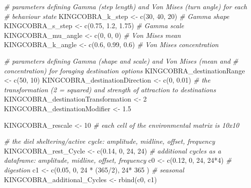 \documentclass[10pt,a4paper]{article}
\newenvironment{Shaded}{}{}
\newcommand{\CommentTok}[1]{\textit{#1}}
\newcommand{\DecValTok}[1]{#1}
\newcommand{\FloatTok}[1]{#1}
\newcommand{\FunctionTok}[1]{#1}
\newcommand{\NormalTok}[1]{#1}
\newcommand{\OtherTok}[1]{#1}
\newcommand{\SpecialCharTok}[1]{#1}
\begin{document}
\begin{Shaded}
\begin{Highlighting}[]
\CommentTok{\# parameters defining Gamma (step length) and Von Mises (turn angle) for each}
\CommentTok{\# behaviour state}
\NormalTok{KINGCOBRA\_k\_step }\OtherTok{\textless{}{-}} \FunctionTok{c}\NormalTok{(}\DecValTok{30}\NormalTok{, }\DecValTok{40}\NormalTok{, }\DecValTok{20}\NormalTok{) }\CommentTok{\# Gamma shape}
\NormalTok{KINGCOBRA\_s\_step }\OtherTok{\textless{}{-}} \FunctionTok{c}\NormalTok{(}\FloatTok{0.75}\NormalTok{, }\FloatTok{1.2}\NormalTok{, }\FloatTok{1.75}\NormalTok{) }\CommentTok{\# Gamma scale}
\NormalTok{KINGCOBRA\_mu\_angle }\OtherTok{\textless{}{-}} \FunctionTok{c}\NormalTok{(}\DecValTok{0}\NormalTok{, }\DecValTok{0}\NormalTok{, }\DecValTok{0}\NormalTok{) }\CommentTok{\# Von Mises mean}
\NormalTok{KINGCOBRA\_k\_angle }\OtherTok{\textless{}{-}} \FunctionTok{c}\NormalTok{(}\FloatTok{0.6}\NormalTok{, }\FloatTok{0.99}\NormalTok{, }\FloatTok{0.6}\NormalTok{) }\CommentTok{\# Von Mises concentration}

\CommentTok{\# parameters defining Gamma (shape and scale) and Von Mises (mean and}
\CommentTok{\# concentration) for foraging destination options}
\NormalTok{KINGCOBRA\_destinationRange }\OtherTok{\textless{}{-}} \FunctionTok{c}\NormalTok{(}\DecValTok{50}\NormalTok{, }\DecValTok{10}\NormalTok{)}
\NormalTok{KINGCOBRA\_destinationDirection }\OtherTok{\textless{}{-}} \FunctionTok{c}\NormalTok{(}\DecValTok{0}\NormalTok{, }\FloatTok{0.01}\NormalTok{)}
\CommentTok{\# the transformation (2 = squared) and strength of attraction to destinations}
\NormalTok{KINGCOBRA\_destinationTransformation }\OtherTok{\textless{}{-}} \DecValTok{2}
\NormalTok{KINGCOBRA\_destinationModifier }\OtherTok{\textless{}{-}} \FloatTok{1.5}

\NormalTok{KINGCOBRA\_rescale }\OtherTok{\textless{}{-}} \DecValTok{10} \CommentTok{\# each cell of the environmental matrix is 10x10}

\CommentTok{\# the diel sheltering/active cycle: amplitude, midline, offset, frequency}
\NormalTok{KINGCOBRA\_rest\_Cycle }\OtherTok{\textless{}{-}} \FunctionTok{c}\NormalTok{(}\FloatTok{0.14}\NormalTok{, }\DecValTok{0}\NormalTok{, }\DecValTok{24}\NormalTok{, }\DecValTok{24}\NormalTok{)}
\CommentTok{\# additional cycles as a dataframe: amplitude, midline, offset, frequency}
\NormalTok{c0 }\OtherTok{\textless{}{-}} \FunctionTok{c}\NormalTok{(}\FloatTok{0.12}\NormalTok{, }\DecValTok{0}\NormalTok{, }\DecValTok{24}\NormalTok{, }\DecValTok{24}\SpecialCharTok{*}\DecValTok{4}\NormalTok{) }\CommentTok{\# digestion}
\NormalTok{c1 }\OtherTok{\textless{}{-}} \FunctionTok{c}\NormalTok{(}\FloatTok{0.05}\NormalTok{, }\DecValTok{0}\NormalTok{, }\DecValTok{24} \SpecialCharTok{*}\NormalTok{ (}\DecValTok{365}\SpecialCharTok{/}\DecValTok{2}\NormalTok{), }\DecValTok{24}\SpecialCharTok{*} \DecValTok{365}\NormalTok{ ) }\CommentTok{\# seasonal}
\NormalTok{KINGCOBRA\_additional\_Cycles }\OtherTok{\textless{}{-}} \FunctionTok{rbind}\NormalTok{(c0, c1)}


\end{Highlighting}
\end{Shaded}
\end{document}
